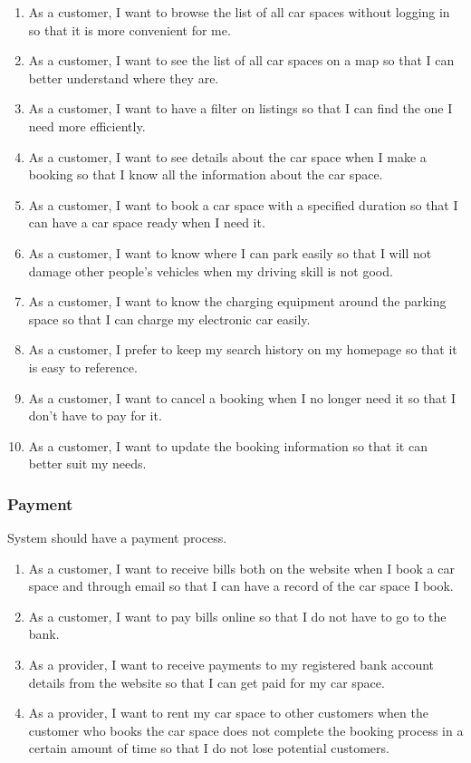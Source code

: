 \documentclass[12pt]{article}
\begin{document}
\begin{enumerate}[resume]
  \item As a customer, I want to browse the list of all car spaces without logging in so that it is more convenient for me.
  \item As a customer, I want to see the list of all car spaces on a map so that I can better understand where they are.
  \item As a customer, I want to have a filter on listings so that I can find the one I need more efficiently.
  \item As a customer, I want to see details about the car space when I make a booking so that I know all the information about the car space.
  \item As a customer, I want to book a car space with a specified duration so that I can have a car space ready when I need it.
  \item As a customer, I want to know where I can park easily so that I will not damage other people's vehicles when my driving skill is not good.
  \item As a customer, I want to know the charging equipment around the parking space so that I can charge my electronic car easily.
  \item As a customer, I prefer to keep my search history on my homepage so that it is easy to reference.
  \item As a customer, I want to cancel a booking when I no longer need it so that I don't have to pay for it.
  \item As a customer, I want to update the booking information so that it can better suit my needs.
\end{enumerate}

\subsubsection{Payment}

System should have a payment process.

\begin{enumerate}[resume]
  \item As a customer, I want to receive bills both on the website when I book a car space and through email so that I can have a record of the car space I book.
  \item As a customer, I want to pay bills online so that I do not have to go to the bank.
  \item As a provider, I want to receive payments to my registered bank account details from the website so that I can get paid for my car space.
  \item As a provider, I want to rent my car space to other customers when the customer who books the car space does not complete the booking process in a certain amount of time so that I do not lose potential customers.
  
\end{enumerate}
\end{document}
